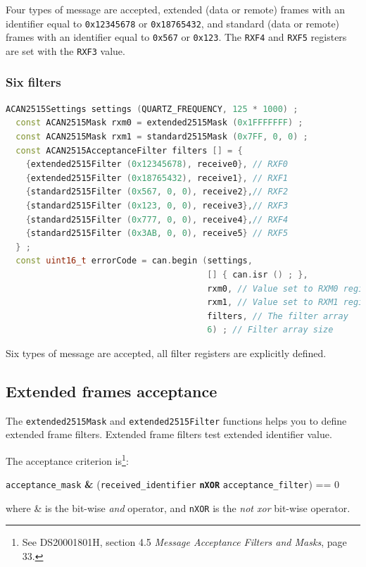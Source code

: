 \documentclass[9pt, a4paper, obeyspaces]{extarticle}
\newcommand \subsubsectionLabel[2]{\subsubsection{#1}\label{subsubsec:#2}}
\begin{document}
Four types of message are accepted, extended (data or remote) frames with an identifier equal to \texttt{0x12345678} or \texttt{0x18765432}, and standard (data or remote) frames with an identifier equal to \texttt{0x567} or \texttt{0x123}. The \texttt{RXF4} and \texttt{RXF5} registers are set with the \texttt{RXF3} value.








\subsubsectionLabel{Six filters}{sixFilters}
{ \small\begin{lstlisting}[language=c++]
  ACAN2515Settings settings (QUARTZ_FREQUENCY, 125 * 1000) ;
  const ACAN2515Mask rxm0 = extended2515Mask (0x1FFFFFFF) ;
  const ACAN2515Mask rxm1 = standard2515Mask (0x7FF, 0, 0) ;
  const ACAN2515AcceptanceFilter filters [] = {
    {extended2515Filter (0x12345678), receive0}, // RXF0
    {extended2515Filter (0x18765432), receive1}, // RXF1
    {standard2515Filter (0x567, 0, 0), receive2},// RXF2
    {standard2515Filter (0x123, 0, 0), receive3},// RXF3
    {standard2515Filter (0x777, 0, 0), receive4},// RXF4
    {standard2515Filter (0x3AB, 0, 0), receive5} // RXF5
  } ;
  const uint16_t errorCode = can.begin (settings,
                                        [] { can.isr () ; },
                                        rxm0, // Value set to RXM0 register
                                        rxm1, // Value set to RXM1 register
                                        filters, // The filter array
                                        6) ; // Filter array size
\end{lstlisting}}

Six types of message are accepted, all filter registers are explicitly defined.










\subsection{Extended frames acceptance}

The \texttt{extended2515Mask} and \texttt{extended2515Filter} functions helps you to define extended frame filters. Extended frame filters test extended identifier value.

The acceptance criterion is\footnote{See DS20001801H, section 4.5 \emph{Message Acceptance Filters and Masks}, page 33.}:

\begin{center}
\texttt{acceptance\_mask} {\bf \&} (\texttt{received\_identifier} \texttt{\bf nXOR} \texttt{acceptance\_filter}) == 0
\end{center}
where \& is the bit-wise \emph{and} operator, and \texttt{nXOR} is the \emph{not xor} bit-wise operator.
\end{document}
